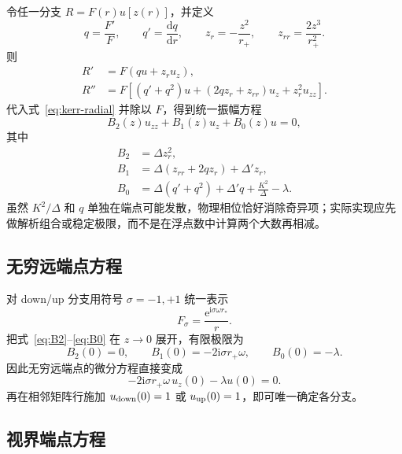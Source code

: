 \documentclass[UTF8,a4paper,11pt]{ctexart}
\newcommand{\dd}{\mathrm d}
\newcommand{\ii}{\mathrm i}
\newcommand{\ee}{\mathrm e}
\newcommand{\Deltak}{\Delta}
\begin{document}
令任一分支 $R=F(r)u[z(r)]$，并定义
\begin{equation}
q=\frac{F'}{F},\qquad q'=\frac{\dd q}{\dd r},\qquad
z_r=-\frac{z^2}{r_+},\qquad z_{rr}=\frac{2z^3}{r_+^2}.
\end{equation}
则
\begin{align}
R'&=F\left(q u+z_r u_z\right),\\
R''&=F\left[(q'+q^2)u+(2qz_r+z_{rr})u_z+z_r^2u_{zz}\right].
\end{align}
代入式~\eqref{eq:kerr-radial} 并除以 $F$，得到统一振幅方程
\begin{equation}
B_2(z)u_{zz}+B_1(z)u_z+B_0(z)u=0,
\label{eq:amplitude-ode}
\end{equation}
其中
\begin{align}
B_2&=\Deltak z_r^2,\label{eq:B2}\\
B_1&=\Deltak(z_{rr}+2qz_r)+\Deltak' z_r,\label{eq:B1}\\
B_0&=\Deltak(q'+q^2)+\Deltak' q
+\frac{K^2}{\Deltak}-\lambda.
\label{eq:B0}
\end{align}
虽然 $K^2/\Deltak$ 和 $q$ 单独在端点可能发散，物理相位恰好消除奇异项；实际实现应先做解析组合或稳定极限，而不是在浮点数中计算两个大数再相减。

\subsection{无穷远端点方程}

对 down/up 分支用符号 $\sigma=-1,+1$ 统一表示
\begin{equation}
F_\sigma=\frac{\ee^{\ii\sigma\omega r_*}}{r}.
\end{equation}
把式~\eqref{eq:B2}--\eqref{eq:B0} 在 $z\to0$ 展开，有限极限为
\begin{equation}
B_2(0)=0,\qquad
B_1(0)=-2\ii\sigma r_+\omega,
\qquad B_0(0)=-\lambda.
\end{equation}
因此无穷远端点的微分方程直接变成
\begin{equation}
\boxed{-2\ii\sigma r_+\omega\,u_z(0)-\lambda u(0)=0.}
\label{eq:kerr-inf-row}
\end{equation}
再在相邻矩阵行施加 $u_{\rm down}(0)=1$ 或 $u_{\rm up}(0)=1$，即可唯一确定各分支。

\subsection{视界端点方程}
\end{document}

